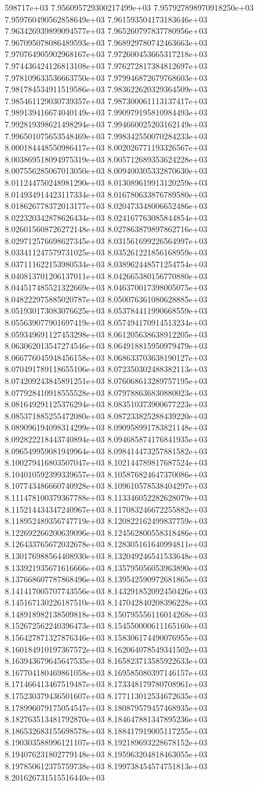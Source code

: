 598717e+03	7.956095729300217499e+03	7.957927898970918250e+03	7.959760490562858649e+03	7.961593504173183646e+03	7.963426939899094577e+03	7.965260797837780956e+03	7.967095078086489593e+03	7.968929780742463663e+03	7.970764905902968167e+03	7.972600453665317218e+03	7.974436424126813108e+03	7.976272817384812697e+03	7.978109633536663750e+03	7.979946872679768603e+03	7.981784534911519586e+03	7.983622620329364509e+03	7.985461129030739357e+03	7.987300061113137417e+03	7.989139416674040149e+03	7.990979195810984493e+03	7.992819398621498294e+03	7.994660025203162149e+03	7.996501075653548469e+03	7.998342550070284233e+03	8.000184448550986417e+03	8.002026771193326567e+03	8.003869518094975319e+03	8.005712689353624228e+03	8.007556285067013050e+03	8.009400305332870630e+03	8.011244750248981290e+03	8.013089619913120259e+03	8.014934914423117334e+03	8.016780633876789580e+03	8.018626778372013177e+03	8.020473348006652486e+03	8.022320342878626434e+03	8.024167763085844854e+03	8.026015608726272148e+03	8.027863879897862716e+03	8.029712576698627345e+03	8.031561699226564997e+03	8.033411247579731025e+03	8.035261221856168959e+03	8.037111622153980534e+03	8.038962448571254754e+03	8.040813701206137011e+03	8.042665380156770880e+03	8.044517485521322669e+03	8.046370017398005075e+03	8.048222975885020787e+03	8.050076361080628885e+03	8.051930173083076625e+03	8.053784411990668559e+03	8.055639077901697419e+03	8.057494170914513234e+03	8.059349691127453298e+03	8.061205638638912205e+03	8.063062013547274546e+03	8.064918815950979479e+03	8.066776045948456158e+03	8.068633703638190127e+03	8.070491789118655106e+03	8.072350302488382113e+03	8.074209243845891251e+03	8.076068613289757195e+03	8.077928410918555528e+03	8.079788636830880023e+03	8.081649291125376294e+03	8.083510373900677223e+03	8.085371885255472080e+03	8.087233825288439220e+03	8.089096194098314299e+03	8.090958991783821148e+03	8.092822218443740894e+03	8.094685874176841935e+03	8.096549959081949964e+03	8.098414473257881582e+03	8.100279416803507047e+03	8.102144789817687524e+03	8.104010592399339657e+03	8.105876824647370086e+03	8.107743486660740928e+03	8.109610578538404297e+03	8.111478100379367788e+03	8.113346052282628079e+03	8.115214434347240967e+03	8.117083246672255882e+03	8.118952489356747719e+03	8.120822162499837759e+03	8.122692266200639096e+03	8.124562800558318486e+03	8.126433765672032678e+03	8.128305161640994811e+03	8.130176988564408930e+03	8.132049246541533648e+03	8.133921935671616666e+03	8.135795056053963890e+03	8.137668607787868496e+03	8.139542590972681865e+03	8.141417005707743556e+03	8.143291852092450426e+03	8.145167130226187510e+03	8.147042840208396228e+03	8.148918982138509818e+03	8.150795556116014268e+03	8.152672562240396473e+03	8.154550000611165160e+03	8.156427871327876346e+03	8.158306174490076955e+03	8.160184910197367572e+03	8.162064078549341502e+03	8.163943679645647535e+03	8.165823713585922633e+03	8.167704180469861058e+03	8.169585080397146157e+03	8.171466413467519487e+03	8.173348179780708961e+03	8.175230379436501607e+03	8.177113012534672635e+03	8.178996079175054547e+03	8.180879579457468935e+03	8.182763513481792870e+03	8.184647881347895236e+03	8.186532683155698578e+03	8.188417919005117255e+03	8.190303588996121107e+03	8.192189693228678152e+03	8.194076231802779148e+03	8.195963204818463055e+03	8.197850612375759738e+03	8.199738454574751813e+03	8.201626731515516440e+03	